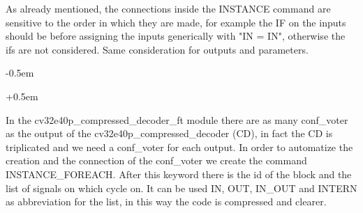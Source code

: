 {{{            As already mentioned, the connections inside the INSTANCE command are sensitive to the order in which they are made, for example the IF on the inputs should be before assigning the inputs generically with "IN = IN", otherwise the ifs are not considered. Same consideration for outputs and parameters. 
        
    		\openup -0.5em
    	
    		\begin{parcolumns}[colwidths={1=0.5\textwidth}, distance=0.5em]{2}
    		\end{parcolumns}
    	
    		\openup +0.5em
    		
        	
        	In the cv32e40p\_compressed\_decoder\_ft module there are as many conf\_voter as the output of the cv32e40p\_compressed\_decoder (CD), in fact the CD is triplicated and we need a conf\_voter for each output. In order to automatize the creation and the connection of the conf\_voter we create the command INSTANCE\_FOREACH. After this keyword there is the id of the block and the list of signals on which cycle on. It can be used IN, OUT, IN\_OUT and INTERN as abbreviation for the list, in this way the code is compressed and clearer.
        	
}}}
